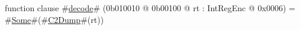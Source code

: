 function clause #\hyperref[zdecode]{decode}# (0b010010 @ 0b00100 @ rt : IntRegEnc @ 0x0006) = #\hyperref[zSome]{Some}#(#\hyperref[zC2Dump]{C2Dump}#(rt))

